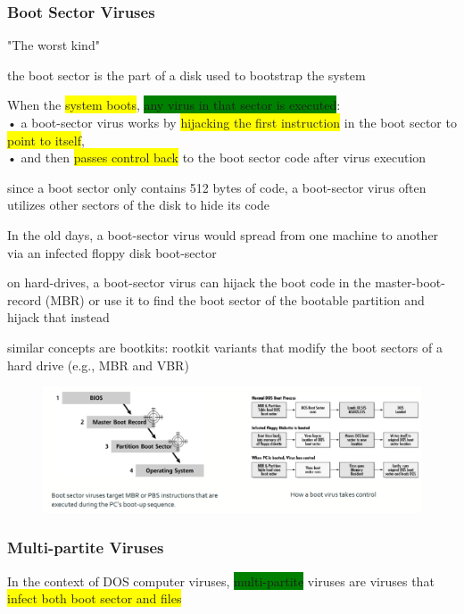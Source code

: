 \documentclass[]{project_plan}
\begin{document}
\subsubsection{Boot Sector Viruses}
"The worst kind"

the boot sector is the part of a disk used to bootstrap the system

When the \colorbox{yellow}{system boots}, \colorbox{green}{any virus in that sector is executed}:\\
• a boot-sector virus works by \colorbox{yellow}{hijacking the first instruction}
in the boot sector to \colorbox{yellow}{point to itself},\\
• and then \colorbox{yellow}{passes control back} to the boot sector code after virus
execution

since a boot sector only contains 512 bytes of code,
a boot-sector virus often utilizes other sectors of
the disk to hide its code

In the old days, a boot-sector virus would
spread from one machine to another via an
infected floppy disk boot-sector

on hard-drives, a boot-sector virus can hijack the boot
code in the master-boot-record (MBR) or use it to find
the boot sector of the bootable partition and hijack that
instead

similar concepts are bootkits: rootkit variants that
modify the boot sectors of a hard drive (e.g., MBR and
VBR)



\begin{figure}[H]
  \centering
  \includegraphics*[width=\linewidth]{boot_sector_viruses.png}
\end{figure}

\subsubsection{Multi-partite Viruses}

In the context of DOS computer viruses, \colorbox{green}{multi-partite} viruses are viruses that \colorbox{yellow}{infect
  both boot sector and files}
\end{document}
